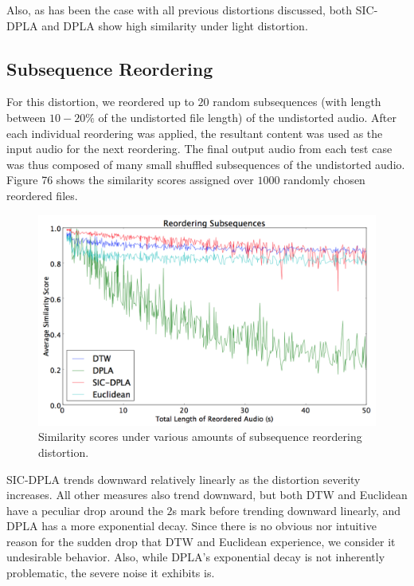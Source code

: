 \documentclass[12pt]{report} 	%
\numberwithin{figure}{chapter}
\numberwithin{table}{chapter}
\numberwithin{equation}{chapter}
\begin{document}
\begin{flushleft}
Also, as has been the case with all previous distortions discussed, both SIC-DPLA and DPLA show high similarity under light distortion.

\vspace{12pt}
\subsection{Subsequence Reordering}
For this distortion, we reordered up to $20$ random subsequences (with length between $10-20\%$ of the undistorted file length) of the undistorted audio. After each individual reordering was applied, the resultant content was used as the input audio for the next reordering. The final output audio from each test case was thus composed of many small shuffled subsequences of the undistorted audio. Figure 76 shows the similarity scores assigned over $1000$ randomly chosen reordered files.
\vspace{12pt}
\begin{figure}[h!]
\vspace{12pt}\begin{center}
\includegraphics[scale=0.5,width=\linewidth]{ReorderedAudio}
\caption[Subsequence reordering results]{Similarity scores under various amounts of subsequence reordering distortion.}
\end{center}
\vspace{6pt}
\end{figure}
SIC-DPLA trends downward relatively linearly as the distortion severity increases. All other measures also trend downward, but both DTW and Euclidean have a peculiar drop around the $2$s mark before trending downward linearly, and DPLA has a more exponential decay. Since there is no obvious nor intuitive reason for the sudden drop that DTW and Euclidean experience, we consider it undesirable behavior. Also, while DPLA's exponential decay is not inherently problematic, the severe noise it exhibits is.


\end{flushleft}
\end{document}
